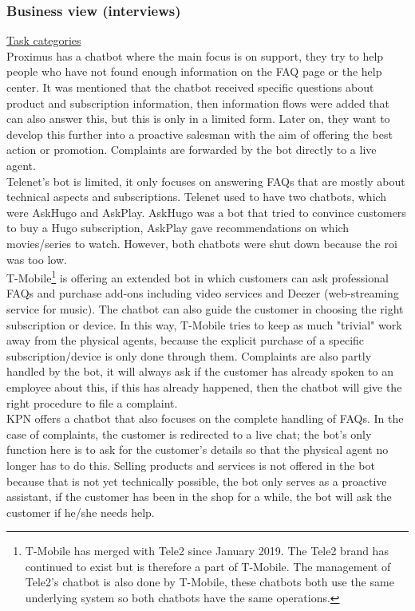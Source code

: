 \subsubsection{Business view (interviews)}
\ul{Task categories}\\
Proximus has a chatbot where the main focus is on support, they try to help people who have not found enough information on the FAQ page or the help center. It was mentioned that the chatbot received specific questions about product and subscription information, then information flows were added that can also answer this, but this is only in a limited form. Later on, they want to develop this further into a proactive salesman with the aim of offering the best action or promotion. Complaints are forwarded by the bot directly to a live agent.\\
\break
Telenet's bot is limited, it only focuses on answering FAQs that are mostly about technical aspects and subscriptions. Telenet used to have two chatbots, which were AskHugo and AskPlay. AskHugo was a bot that tried to convince customers to buy a Hugo subscription, AskPlay gave recommendations on which movies/series to watch. However, both chatbots were shut down because the \acrshort{roi} was too low.\\
\break
T-Mobile\footnote{T-Mobile has merged with Tele2 since January 2019. The Tele2 brand has continued to exist but is therefore a part of T-Mobile. The management of Tele2's chatbot is also done by T-Mobile, these chatbots both use the same underlying system so both chatbots have the same operations.} is offering an extended bot in which customers can ask professional FAQs and purchase add-ons including video services and Deezer (web-streaming service for music). The chatbot can also guide the customer in choosing the right subscription or device. In this way, T-Mobile tries to keep as much "trivial" work away from the physical agents, because the explicit purchase of a specific subscription/device is only done through them. Complaints are also partly handled by the bot, it will always ask if the customer has already spoken to an employee about this, if this has already happened, then the chatbot will give the right procedure to file a complaint.\\
\break
KPN offers a chatbot that also focuses on the complete handling of FAQs. In the case of complaints, the customer is redirected to a live chat; the bot's only function here is to ask for the customer's details so that the physical agent no longer has to do this. Selling products and services is not offered in the bot because that is not yet technically possible, the bot only serves as a proactive assistant, if the customer has been in the shop for a while, the bot will ask the customer if he/she needs help.\\
